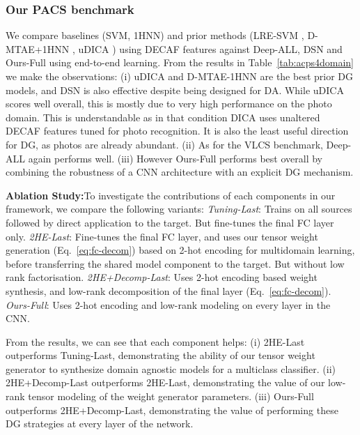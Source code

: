 \documentclass[10pt,twocolumn,letterpaper]{article}
\begin{document}
\subsubsection{Our PACS benchmark}
We compare baselines (SVM, 1HNN) and prior methods (LRE-SVM \cite{xu2014exploiting}, D-MTAE+1HNN \cite{ghifary2015domain}, uDICA \cite{muandet2013domainGen}) using DECAF features against Deep-ALL, DSN \cite{bousmalis2016domain} and Ours-Full using end-to-end learning. From the results in Table~\ref{tab:acps4domain} we make the observations: (i) uDICA and D-MTAE-1HNN are the best prior DG models, and DSN is also effective despite being designed for DA. While uDICA scores well overall, this is mostly due to very high performance on the photo domain. This is understandable as in that condition DICA uses unaltered DECAF features tuned for photo recognition. It is also the least useful direction for DG, as photos are already abundant.
(ii) As for the VLCS benchmark, Deep-ALL again performs well. (iii) However Ours-Full performs best overall by combining the robustness of a CNN architecture with an explicit DG mechanism.











\noindent\textbf{Ablation Study:}\quad To investigate the contributions of each components in our framework, we compare the following variants: \emph{Tuning-Last}: Trains on all sources followed by direct application to the target. But fine-tunes the final FC layer only. \emph{2HE-Last}: Fine-tunes the final FC layer, and uses our tensor weight generation (Eq.~\ref{eq:fc-decom}) based on 2-hot encoding for multidomain learning, before transferring the shared model component to the target. But without low rank factorisation. \emph{2HE+Decomp-Last}: Uses 2-hot encoding based weight synthesis, and low-rank decomposition of the final layer (Eq.~\ref{eq:fc-decom}). \emph{Ours-Full}: Uses 2-hot encoding and low-rank modeling on every layer in the CNN. 

From the results, we can see that each component helps: (i) 2HE-Last outperforms Tuning-Last, demonstrating the ability of our tensor weight generator to synthesize domain agnostic models for a multiclass classifier. (ii) 2HE+Decomp-Last outperforms 2HE-Last, demonstrating the value of our low-rank tensor modeling of the weight generator parameters. (iii) Ours-Full outperforms 2HE+Decomp-Last, demonstrating the value of performing these DG strategies at every layer of the network. 
\end{document}
